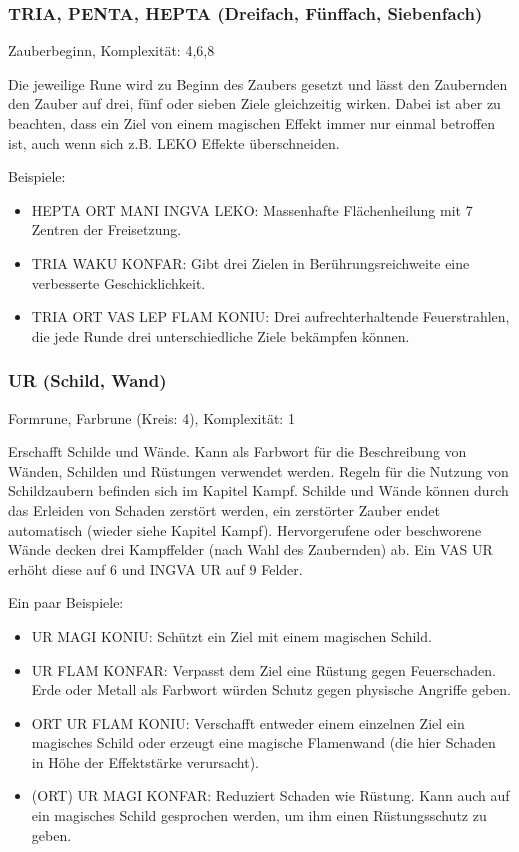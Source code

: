 \documentclass{article}
\begin{document}
\subsubsection{TRIA, PENTA, HEPTA (Dreifach, Fünffach, Siebenfach)}

Zauberbeginn, Komplexität: 4,6,8

Die jeweilige Rune wird zu Beginn des Zaubers gesetzt und lässt den Zaubernden den Zauber auf drei, fünf oder sieben
Ziele gleichzeitig wirken. Dabei ist aber zu beachten, dass ein Ziel von einem magischen Effekt immer nur einmal
betroffen ist, auch wenn sich z.B. LEKO Effekte überschneiden.

Beispiele:

\begin{itemize}
\item HEPTA ORT MANI INGVA LEKO: Massenhafte Flächenheilung mit 7 Zentren der Freisetzung.
\item TRIA WAKU KONFAR: Gibt drei Zielen in Berührungsreichweite eine verbesserte Geschicklichkeit.
\item TRIA ORT VAS LEP FLAM KONIU: Drei aufrechterhaltende Feuerstrahlen, die jede Runde drei unterschiedliche Ziele bekämpfen können.
\end{itemize}

\subsubsection{UR (Schild, Wand)}

Formrune, Farbrune (Kreis: 4), Komplexität: 1

Erschafft Schilde und Wände. Kann als Farbwort für die Beschreibung von Wänden, Schilden und Rüstungen verwendet
werden. Regeln für die Nutzung von Schildzaubern befinden sich im Kapitel Kampf. Schilde und Wände können durch das
Erleiden von Schaden zerstört werden, ein zerstörter Zauber endet automatisch (wieder siehe Kapitel Kampf).
Hervorgerufene oder beschworene Wände decken drei Kampffelder (nach Wahl des Zaubernden) ab. Ein VAS UR erhöht diese
auf 6 und INGVA UR auf 9 Felder.

Ein paar Beispiele:

\begin{itemize}
\item UR MAGI KONIU: Schützt ein Ziel mit einem magischen Schild.
\item UR FLAM KONFAR: Verpasst dem Ziel eine Rüstung gegen Feuerschaden. Erde oder Metall als Farbwort würden Schutz gegen physische Angriffe geben.
\item ORT UR FLAM KONIU: Verschafft entweder einem einzelnen Ziel ein magisches Schild oder erzeugt eine magische Flamenwand (die hier Schaden in Höhe der Effektstärke verursacht).
\item (ORT) UR MAGI KONFAR: Reduziert Schaden wie Rüstung. Kann auch auf ein magisches Schild gesprochen werden, um ihm einen Rüstungsschutz zu geben.
\end{itemize}
\end{document}
